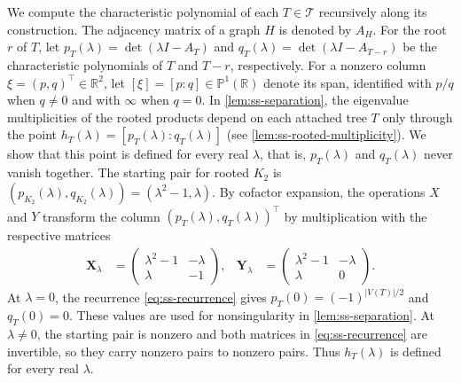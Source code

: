 \documentclass[11pt,a4paper]{article}
\theoremstyle{plain}
\theoremstyle{definition}
\newcommand{\R}{\mathbb{R}}
\begin{document}
We compute the characteristic polynomial of each $T\in\mathcal T$
recursively along its construction.
The adjacency matrix of a graph $H$ is denoted by $A_H$.
For the root $r$ of $T$, let $p_T(\lambda)=\det(\lambda I-A_T)$ and
$q_T(\lambda)=\det(\lambda I-A_{T-r})$ be the characteristic polynomials of $T$ and
$T-r$, respectively.
For a nonzero column $\xi=(p,q)^{\top}\in\R^2$, let
$[\xi]=[p:q]\in\mathbb P^1(\R)$ denote its span, identified with $p/q$ when $q\ne0$
and with $\infty$ when $q=0$.
In \cref{lem:ss-separation}, the eigenvalue multiplicities of the
rooted products depend on each attached tree $T$ only through the point
$h_T(\lambda)=[p_T(\lambda):q_T(\lambda)]$
(see \cref{lem:ss-rooted-multiplicity}).
We show that this point is defined for every real $\lambda$, that is,
$p_T(\lambda)$ and $q_T(\lambda)$ never vanish together.
The starting pair for rooted $K_2$ is
$(p_{K_2}(\lambda),q_{K_2}(\lambda))=(\lambda^2-1,\lambda)$.
By cofactor expansion, the operations $X$ and $Y$
transform the column $(p_T(\lambda),q_T(\lambda))^{\top}$ by multiplication
with the respective matrices
\begin{equation}\label{eq:ss-recurrence}
 \begin{aligned}
 \mathbf{X}_\lambda&=\begin{pmatrix}\lambda^2-1&-\lambda\\\lambda&-1\end{pmatrix},
 &\mathbf{Y}_\lambda&=\begin{pmatrix}\lambda^2-1&-\lambda\\\lambda&0\end{pmatrix}.
 \end{aligned}
\end{equation}
At $\lambda=0$, the recurrence \cref{eq:ss-recurrence} gives
$p_T(0)=(-1)^{|V(T)|/2}$ and $q_T(0)=0$.
These values are used for nonsingularity in \cref{lem:ss-separation}.
At $\lambda\ne0$, the starting pair is nonzero and both
matrices in \cref{eq:ss-recurrence} are invertible, so they carry
nonzero pairs to nonzero pairs.
Thus $h_T(\lambda)$ is defined for every real $\lambda$.
\end{document}
